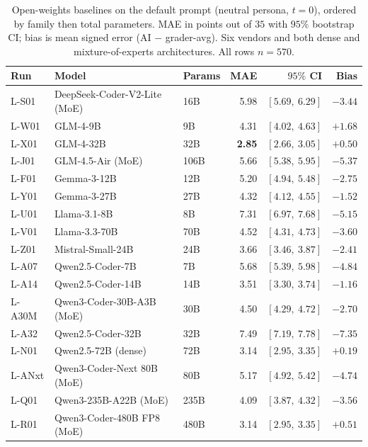 \begin{table}[h]
\centering
\caption{Open-weights baselines on the default prompt (neutral persona, $t = 0$), ordered by family then total parameters. MAE in points out of $35$ with $95\%$ bootstrap CI; bias is mean signed error (AI $-$ grader-avg). Six vendors and both dense and mixture-of-experts architectures. All rows $n = 570$.}
\label{tab:openbaselines}
\small
\begin{tabular}{lllrrr}
\toprule
Run & Model & Params & MAE & $95\%$ CI & Bias \\
\midrule
L-S01 & DeepSeek-Coder-V2-Lite (MoE) & 16B & 5.98 & $[5.69,\ 6.29]$ & $-3.44$ \\
\midrule
L-W01 & GLM-4-9B                     & 9B   & 4.31 & $[4.02,\ 4.63]$ & $+1.68$ \\
L-X01 & GLM-4-32B                    & 32B  & \textbf{2.85} & $[2.66,\ 3.05]$ & $+0.50$ \\
L-J01 & GLM-4.5-Air (MoE)            & 106B & 5.66 & $[5.38,\ 5.95]$ & $-5.37$ \\
\midrule
L-F01 & Gemma-3-12B                  & 12B  & 5.20 & $[4.94,\ 5.48]$ & $-2.75$ \\
L-Y01 & Gemma-3-27B                  & 27B  & 4.32 & $[4.12,\ 4.55]$ & $-1.52$ \\
\midrule
L-U01 & Llama-3.1-8B                 & 8B   & 7.31 & $[6.97,\ 7.68]$ & $-5.15$ \\
L-V01 & Llama-3.3-70B                & 70B  & 4.52 & $[4.31,\ 4.73]$ & $-3.60$ \\
\midrule
L-Z01 & Mistral-Small-24B            & 24B  & 3.66 & $[3.46,\ 3.87]$ & $-2.41$ \\
\midrule
L-A07 & Qwen2.5-Coder-7B             & 7B   & 5.68 & $[5.39,\ 5.98]$ & $-4.84$ \\
L-A14 & Qwen2.5-Coder-14B            & 14B  & 3.51 & $[3.30,\ 3.74]$ & $-1.16$ \\
L-A30M & Qwen3-Coder-30B-A3B (MoE)   & 30B  & 4.50 & $[4.29,\ 4.72]$ & $-2.70$ \\
L-A32 & Qwen2.5-Coder-32B            & 32B  & 7.49 & $[7.19,\ 7.78]$ & $-7.35$ \\
L-N01 & Qwen2.5-72B (dense)          & 72B  & 3.14 & $[2.95,\ 3.35]$ & $+0.19$ \\
L-ANxt & Qwen3-Coder-Next 80B (MoE)  & 80B  & 5.17 & $[4.92,\ 5.42]$ & $-4.74$ \\
L-Q01 & Qwen3-235B-A22B (MoE)        & 235B & 4.09 & $[3.87,\ 4.32]$ & $-3.56$ \\
L-R01 & Qwen3-Coder-480B FP8 (MoE)   & 480B & 3.14 & $[2.95,\ 3.35]$ & $+0.51$ \\
\bottomrule
\end{tabular}
\end{table}

